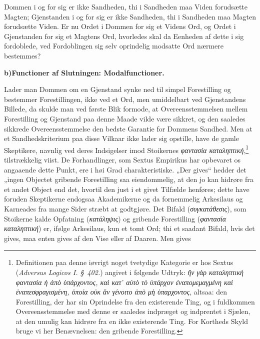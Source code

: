 \documentclass[12pt]{book}
\newcommand{\opage}[1]{\marginnote{\footnotesize\textit{[#1]}}}
\begin{document}
Dommen i og for sig er ikke Sandheden, thi i Sandheden
maa Viden forudsætte Magten; Gjenstanden i og for
sig er ikke Sandheden, thi i Sandheden maa Magten forudsætte
Viden. Er nu Ordet i Dommen for sig et Videns Ord,
og Ordet i Gjenstanden for sig et Magtens Ord, hvorledes
\opage{282}skal da Eenheden af dette i sig fordoblede, ved Fordoblingen sig
selv oprindelig modsatte Ord nærmere bestemmes?

\begin{center}{\bfseries b)\quad Functioner af Slutningen: Modalfunctioner.}\end{center}

Lader man Dommen om en Gjenstand synke ned til
simpel Forestilling og bestemmer Forestillingen, ikke ved et
Ord, men umiddelbart ved Gjenstandens Billede, da skulde
man ved første Blik formode, at Overeensstemmelsen mellem
Forestilling og Gjenstand paa denne Maade vilde være sikkret,
og den saaledes sikkrede Overeensstemmelse den bedste Garantie
for Dommens Sandhed. Men at et Sandhedskriterium paa
disse Vilkaar ikke lader sig opstille, have de gamle Skeptikere,
navnlig ved deres Indsigelser imod Stoikernes \textit{φαντασία
καταληπτική},\footnote{Definitionen paa denne iøvrigt noget tvetydige Kategorie er hos
Sextus (\textit{Adversus Logicos I. §~402.}) angivet i følgende Udtryk:
\textit{ἤν γὰρ καταληπτικὴ φαντασία ἡ ἀπὸ ὑπάρχοντος, καὶ κατ᾿
αὐτὸ τὸ ὑπάρχον ἐναπομεμαγμένη καὶ ἐναπεσφραγισμένη,
ὁποία οὐκ ἄν γένοιτο ἀπὸ μὴ ὑπαρχοντος}, altsaa: den Forestilling,
der har sin Oprindelse fra den existerende Ting, og i fuldkommen
Overeensstemmelse med denne er saaledes indpræget og indprentet
i Sjælen, at den umulig kan hidrøre fra en ikke existerende
Ting. For Kortheds Skyld bruge vi her Benævnelsen: den gribende
Forestilling.}%
{} tilstrækkelig viist. De Forhandlinger, som
Sextus Empirikus har opbevaret os angaaende dette Punkt, ere
i høi Grad charakteristiske. „Der gives“ hedder det „ingen Objectet
gribende Forestilling saa eiendommelig, at den jo kan hidrøre
fra et andet Object end det, hvortil den just i et givet Tilfælde
henføres; dette have foruden Skeptikerne endogsaa Akademikerne
og da fornemmelig Arkesilaus og Karneades fra
mange Sider stræbt at godtgjøre. Det Bifald (\textit{συγκατάθεσις}),
som Stoikerne kalde Opfatning (\textit{κατάληψις}) og gribende
Forestilling (\textit{φαντασία καταληπτική}) er, ifølge Arkesilaus,
kun et tomt Ord; thi et saadant Bifald, hvis det gives,
\opage{283}maa enten gives af den Vise eller af Daaren. Men gives
\end{document}
